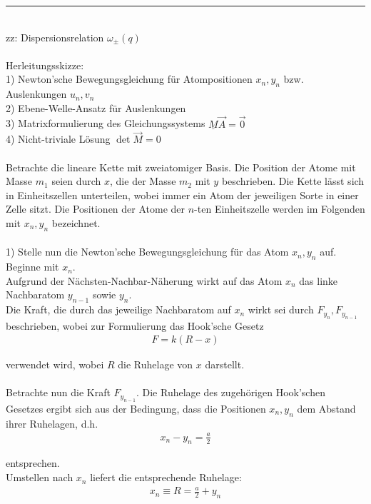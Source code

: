 \documentclass{article}
\begin{document}
{\color{violet}
\hrule
	\\
	zz: Dispersionsrelation $\omega_\pm(q)$\\
	\\
	Herleitungsskizze:\\
	1) Newton'sche Bewegungsgleichung für Atompositionen $x_n, y_n$ bzw. Auslenkungen $u_n, v_n$ \\
	2) Ebene-Welle-Ansatz für Auslenkungen \\
	3) Matrixformulierung des Gleichungssystems $\underline{M} \vec{A} = \vec{0} $ \\
	4) Nicht-triviale Lösung $\det \vec{M} = 0$ \\
	\\
	Betrachte die lineare Kette mit zweiatomiger Basis. Die Position der Atome mit Masse $m_1$ seien durch $x$, die der Masse $m_2$ mit $y$ beschrieben. Die Kette lässt sich in Einheitszellen unterteilen, wobei immer ein Atom der jeweiligen Sorte in einer Zelle sitzt. Die Positionen der Atome der $n$-ten Einheitszelle werden im Folgenden mit $x_n, y_n$ bezeichnet.\\
	\\
	1) Stelle nun die Newton'sche Bewegungsgleichung für das Atom $x_n, y_n$ auf.\\
	Beginne mit $x_n$.\\
	Aufgrund der Nächsten-Nachbar-Näherung wirkt auf das Atom $x_n$ das linke Nachbaratom $y_{n-1}$ sowie $y_n$.\\
	Die Kraft, die durch das jeweilige Nachbaratom auf $x_n$ wirkt sei durch $F_{y_n}, F_{y_{n-1}}$ beschrieben, wobei zur Formulierung das Hook'sche Gesetz
		\begin{align*}
			F = k( R  - x )
		\end{align*}
	
	verwendet wird, wobei $R$ die Ruhelage von $x$ darstellt.\\
	\\
	Betrachte nun die Kraft $F_{y_{n-1}}$. Die Ruhelage des zugehörigen Hook'schen Gesetzes ergibt sich aus der Bedingung, dass die Positionen $x_n, y_n$ dem Abstand ihrer Ruhelagen, d.h.
		\begin{align*}
			x_n - y_n = \frac{a}{2}
		\end{align*}
	
	entsprechen.\\
	Umstellen nach $x_n$ liefert die entsprechende Ruhelage:
		\begin{align*}
			x_n \equiv R = \frac{a}{2} + y_n
		\end{align*}

}
\end{document}
